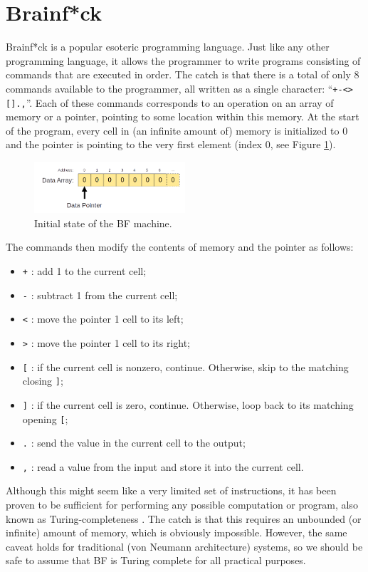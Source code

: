 \section{Brainf*ck}\label{section:brainfck}                                                       
Brainf*ck is a popular esoteric programming language. Just like any other programming language, it allows the programmer to write programs consisting of commands that are executed in order. The catch is that there is a total of only 8 commands available to the programmer, all written as a single character: ``\texttt{+-<>[].,}''. Each of these commands corresponds to an operation on an array of memory or a pointer, pointing to some location within this memory. At the start of the program, every cell in (an infinite amount of) memory is initialized to 0 and the pointer is pointing to the very first element (index 0, see Figure \ref{fig:bfmachine_initial}).
%
\begin{figure}[H]
  \centering
  \includegraphics[width=0.5\textwidth]{img/bfmachine_initial}
  \caption{Initial state of the BF machine.}
  \label{fig:bfmachine_initial}
\end{figure}
%
The commands then modify the contents of memory and the pointer as follows:
\begin{itemize}
\item \texttt{+} : add 1 to the current cell;
\item \texttt{-} : subtract 1 from the current cell;
\item \texttt{<} : move the pointer 1 cell to its left;
\item \texttt{>} : move the pointer 1 cell to its right;
\item \texttt{[} : if the current cell is nonzero, continue. Otherwise, skip to the matching closing \texttt{]};
\item \texttt{]} : if the current cell is zero, continue. Otherwise, loop back to its matching opening \texttt{[};
\item \texttt{.} : send the value in the current cell to the output;
\item \texttt{,} : read a value from the input and store it into the current cell.
\end{itemize}
Although this might seem like a very limited set of instructions, it has been proven to be sufficient for performing any possible computation or program, also known as Turing-completeness \cite{esolang}. The catch is that this requires an unbounded (or infinite) amount of memory, which is obviously impossible. However, the same caveat holds for traditional (von Neumann architecture) systems, so we should be safe to assume that BF is Turing complete for all practical purposes.

